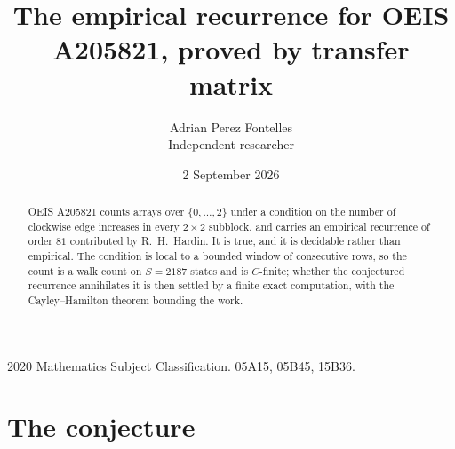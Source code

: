 \documentclass[11pt,a4paper]{article}
\title{The empirical recurrence for OEIS A205821, proved by transfer matrix}
\author{Adrian Perez Fontelles\\ \small Independent researcher}
\date{2 September 2026}
\theoremstyle{plain}
\theoremstyle{definition}
\begin{document}
\maketitle

\begin{abstract}
OEIS A205821 counts arrays over $\{0,\dots,2\}$ under a condition on the number of clockwise edge increases
in every $2\times2$ subblock, and carries an empirical recurrence of order $81$ contributed by
R.~H.~Hardin. It is true, and it is decidable rather than empirical. The condition is local to
a bounded window of consecutive rows, so the count is a walk count on $S=2187$ states and is
$C$-finite; whether the conjectured recurrence annihilates it is then settled by a finite exact
computation, with the Cayley--Hamilton theorem bounding the work.
\end{abstract}

\noindent\small 2020 Mathematics Subject Classification. 05A15, 05B45, 15B36.\normalsize

\section{The conjecture}
\end{document}
